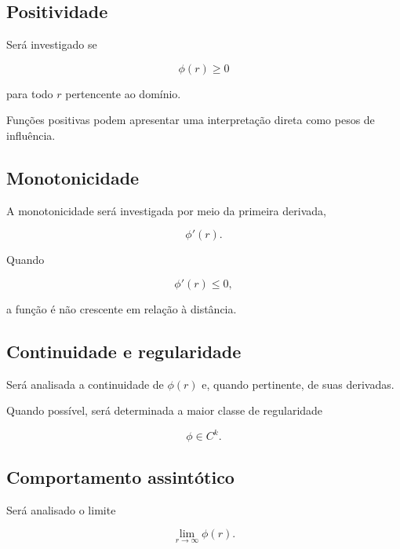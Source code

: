 \documentclass[12pt,a4paper]{article}
\begin{document}
	\subsection{Positividade}
	
	Será investigado se
	
	\begin{equation}
		\phi(r)\geq0
	\end{equation}
	
	para todo $r$ pertencente ao domínio.
	
	Funções positivas podem apresentar uma interpretação direta como pesos
	de influência.
	
	\subsection{Monotonicidade}
	
	A monotonicidade será investigada por meio da primeira derivada,
	
	\begin{equation}
		\phi'(r).
	\end{equation}
	
	Quando
	
	\begin{equation}
		\phi'(r)\leq0,
	\end{equation}
	
	a função é não crescente em relação à distância.
	
	\subsection{Continuidade e regularidade}
	
	Será analisada a continuidade de $\phi(r)$ e, quando pertinente, de suas
	derivadas.
	
	Quando possível, será determinada a maior classe de regularidade
	
	\begin{equation}
		\phi \in C^k.
	\end{equation}
	
	\subsection{Comportamento assintótico}
	
	Será analisado o limite
	
	\begin{equation}
		\lim_{r\rightarrow\infty}\phi(r).
	\end{equation}
	
\end{document}
